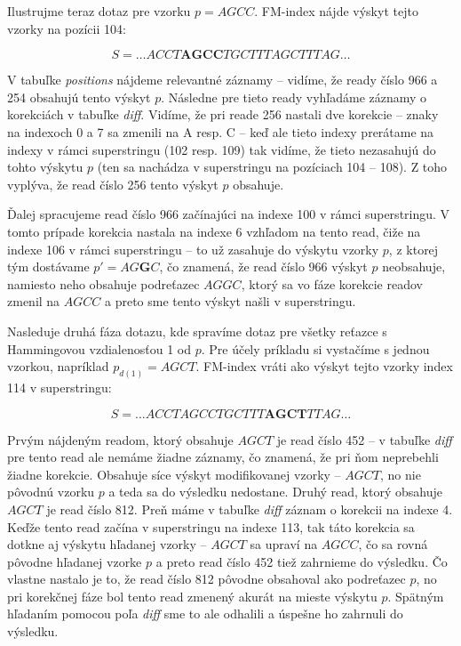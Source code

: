 \begin{example}
Ilustrujme teraz dotaz pre vzorku $p=AGCC$. FM-index nájde výskyt tejto vzorky na pozícii 104:

$$S=\ldots ACCT \mathbf{AGCC} TGCTTTAGCTTTAG \ldots$$

V tabuľke \emph{positions} nájdeme relevantné záznamy -- vidíme, že ready číslo 966 a 254 obsahujú tento výskyt $p$. Následne pre tieto ready vyhľadáme záznamy o korekciách v tabuľke \emph{diff}. Vidíme, že pri reade 256 nastali dve korekcie -- znaky na indexoch 0 a 7 sa zmenili na A resp. C -- keď ale tieto indexy prerátame na indexy v rámci superstringu (102 resp. 109) tak vidíme, že tieto nezasahujú do tohto výskytu $p$ (ten sa nachádza v superstringu na pozíciach 104 -- 108). Z toho vyplýva, že read číslo 256 tento výskyt $p$ obsahuje.

Ďalej spracujeme read číslo 966 začínajúci na indexe 100 v rámci superstringu. V tomto prípade korekcia nastala na indexe 6 vzhľadom na tento read, čiže na indexe 106 v rámci superstringu -- to už zasahuje do výskytu vzorky $p$, z ktorej tým dostávame $p'=AG\mathbf{G}C$, čo znamená, že read číslo 966 výskyt $p$ neobsahuje, namiesto neho obsahuje podreťazec $AGGC$, ktorý sa vo fáze korekcie readov zmenil na $AGCC$ a preto sme tento výskyt našli v superstringu.

Nasleduje druhá fáza dotazu, kde spravíme dotaz pre všetky reťazce s Hammingovou vzdialenosťou 1 od $p$. Pre účely príkladu si vystačíme s jednou vzorkou, napríklad $p_{d(1)}=AGCT$. FM-index vráti ako výskyt tejto vzorky index 114 v superstringu:

$$S=\ldots ACCTAGCCTGCTTT \mathbf{AGCT} TTAG \ldots$$

Prvým nájdeným readom, ktorý obsahuje $AGCT$ je read číslo 452 -- v tabuľke \emph{diff} pre tento read ale nemáme žiadne záznamy, čo znamená, že pri ňom neprebehli žiadne korekcie. Obsahuje síce výskyt modifikovanej vzorky -- $AGCT$, no nie pôvodnú vzorku $p$ a teda sa do výsledku nedostane. Druhý read, ktorý obsahuje $AGCT$ je read číslo 812. Preň máme v tabuľke \emph{diff} záznam o korekcii na indexe 4. Keďže tento read začína v superstringu na indexe 113, tak táto korekcia sa dotkne aj výskytu hľadanej vzorky -- $AGCT$ sa upraví na $AGCC$, čo sa rovná pôvodne hľadanej vzorke $p$ a preto read číslo 452 tiež zahrnieme do výsledku. Čo vlastne nastalo je to, že read číslo 812 pôvodne obsahoval ako podreťazec $p$, no pri korekčnej fáze bol tento read zmenený akurát na mieste výskytu $p$. Spätným hľadaním pomocou poľa \emph{diff} sme to ale odhalili a úspešne ho zahrnuli do výsledku.
\end{example}

